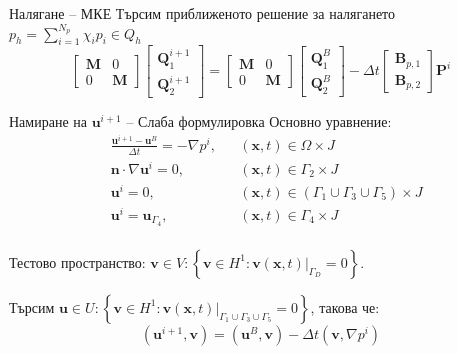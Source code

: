 \documentclass{beamer}
\newcommand{\dotprod}[2]{\left(#1, #2\right)}
\newcommand{\grad}[1]{\nabla#1}
\newcommand{\vecf}[1]{\boldsymbol{#1}}
\begin{document}
\begin{frame}{Налягане -- МКЕ}
	Търсим приближеното решение за налягането $p_h = \sum\limits_{i=1}^{N_p}{\chi_ip_i} \in Q_h$
	$$
	\begin{bmatrix}
		\mathbf{M} & 0 \\
		0 & \mathbf{M}
	\end{bmatrix} \begin{bmatrix}
		\vecf{Q}^{i+1}_1 \\
		\vecf{Q}^{i+1}_2
	\end{bmatrix} =	\begin{bmatrix}
		\mathbf{M} & 0 \\
		0 & \mathbf{M}
	\end{bmatrix} \begin{bmatrix}
		\vecf{Q}^{B}_1 \\
		\vecf{Q}^{B}_2
	\end{bmatrix} - \Delta t \begin{bmatrix}
		\vecf{B}_{p,1} \\
		\vecf{B}_{p,2}
	\end{bmatrix} \vecf{P}^i
	$$
\end{frame}

\begin{frame}{Намиране на $\textbf{u}^{i+1}$ -- Слаба формулировка}
Основно уравнение:
\begin{align*}
		&\frac{\vecf{u}^{i+1} - \vecf{u}^B}{\Delta t} = -\nabla p^i, &&\left(\vecf{x}, t\right) \in \Omega \times J\\
		&\vecf{n} \cdot \grad{\vecf{u}^i} = 0, && \left(\vecf{x}, t\right) \in \Gamma_2 \times J \\
		&\vecf{u}^i = 0, &&\left(\vecf{x}, t\right) \in \left(\Gamma_1 \cup \Gamma_3 \cup \Gamma_5\right) \times J \\
		&\vecf{u}^i = \vecf{u}_{\Gamma_4}, && \left(\vecf{x}, t\right) \in \Gamma_4 \times J \\
\end{align*}

	Тестово пространство: $\vecf{v} \in V : \left\{\vecf{v} \in H^1 : \vecf{v}(\vecf{x}, t)|_{\Gamma_D} = 0 \right\}$.
	
	Търсим $\vecf{u} \in U : \left\{\vecf{v} \in H^1 : \vecf{v}(\vecf{x}, t)|_{\Gamma_1 \cup \Gamma_3 \cup \Gamma_5} = 0\right\}$, такова че:
	$$
	\dotprod{\vecf{u}^{i+1}}{\vecf{v}} = \dotprod{\vecf{u}^B}{\vecf{v}} - \Delta t\dotprod{\vecf{v}} {\grad{p^i}}
	$$

\end{frame}
\end{document}
